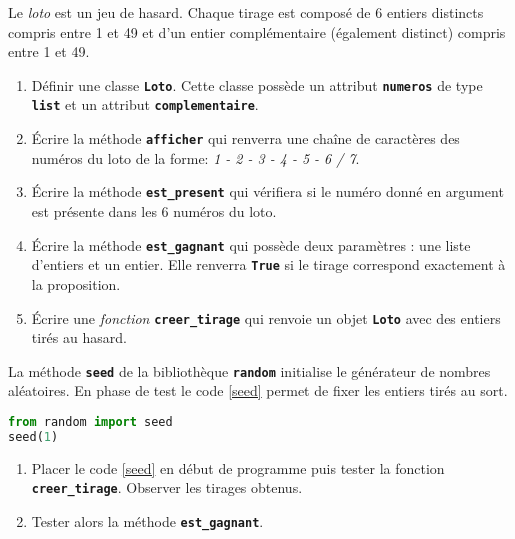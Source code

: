 \documentclass[a4paper,11pt]{article}
\begin{document}
\begin{exo}
    Le \emph{loto} est un jeu de hasard. Chaque tirage est composé de 6 entiers distincts compris entre 1 et 49 et d'un entier complémentaire (également distinct) compris entre 1 et 49.
    \begin{enumerate}
        \item Définir une classe \textbf{\texttt{Loto}}. Cette classe possède un attribut \textbf{\texttt{numeros}} de type \textbf{\texttt{list}} et un attribut \textbf{\texttt{complementaire}}.
        \item Écrire la méthode \textbf{\texttt{afficher}} qui renverra une chaîne de caractères des numéros du loto de la forme: \emph{1 - 2 - 3 - 4 - 5 - 6 / 7}.
        \item Écrire la méthode \textbf{\texttt{est\_present}} qui vérifiera si le numéro donné en argument est présente dans les 6 numéros du loto.
        \item Écrire la méthode \textbf{\texttt{est\_gagnant}} qui possède deux paramètres : une liste d'entiers et un entier. Elle renverra \texttt{\textbf{True}} si le tirage correspond exactement à la proposition.
        \item Écrire une \emph{fonction} \textbf{\texttt{creer\_tirage}} qui renvoie un objet \textbf{\texttt{Loto}} avec des entiers tirés au hasard.
    \end{enumerate}
\begin{aretenir}[Information]
La méthode \textbf{\texttt{seed}} de la bibliothèque \textbf{\texttt{random}} initialise le générateur de nombres aléatoires. En phase de test le code \ref{seed} permet de fixer les entiers tirés au sort.
\begin{center}
\begin{lstlisting}[language=Python  , xleftmargin=2em, xrightmargin=2em]
from random import seed
seed(1)
\end{lstlisting}
\label{seed}
\end{center}
\end{aretenir}
\begin{enumerate}[resume]
    \item Placer le code \ref{seed} en début de programme puis tester la fonction \textbf{\texttt{creer\_tirage}}. Observer les tirages obtenus.
    \item Tester alors la méthode \textbf{\texttt{est\_gagnant}}.
\end{enumerate}
\end{exo}
\end{document}
